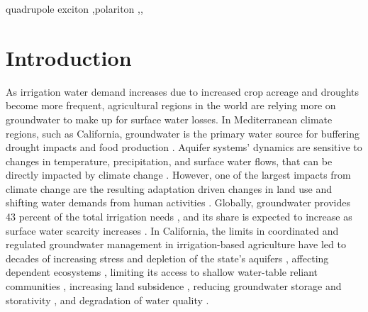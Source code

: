 \documentclass[a4paper,fleqn]{cas-sc}
\begin{document}
\begin{keywords}
quadrupole exciton \sep polariton \sep \WGM \sep \BEC
\end{keywords}


\maketitle

\section{Introduction}

As irrigation water demand increases due to increased crop acreage and droughts become more frequent, agricultural regions in the world are relying more on groundwater to make up for surface water losses. In Mediterranean climate regions, such as California, groundwater is the primary water source for buffering drought impacts and food production \citep{malmgren_groundwater_2022,priyan_issues_2021}. Aquifer systems’ dynamics are sensitive to changes in temperature, precipitation, and surface water flows, that can be directly impacted by climate change \citep{cuthbert_global_2019,wu_divergent_2020}. However, one of the largest impacts from climate change are the resulting adaptation driven changes in land use and shifting water demands from human activities \citep{taylor_ground_2013}. Globally, groundwater provides 43 percent of the total irrigation needs \citep{siebert_groundwater_2010}, and its share is expected to increase as surface water scarcity increases \citep{wada_nonsustainable_2012}. In California, the limits in coordinated and regulated groundwater management in irrigation-based agriculture have led to decades of increasing stress and depletion of the state's aquifers \citep{vasco_satellite-based_2019}, affecting dependent ecosystems \citep{bierkens_non-renewable_2019}, limiting its access to shallow water-table reliant communities \citep{pauloo_domestic_2020,perrone_dry_2017}, increasing land subsidence \citep{smith_groundwater_2020}, reducing groundwater storage and storativity \citep{alam_post-drought_2021}, and degradation of water quality \citep{levy_critical_2021}. 
\end{document}
